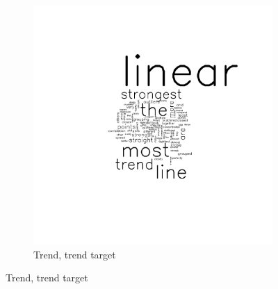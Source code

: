 \documentclass[11pt]{isuthesis}\usepackage[]{graphicx}\usepackage[]{color}
\begin{document}
\begin{figure}[ht]
\begin{subfigure}[t]{0.25\linewidth}
\end{subfigure}
\begin{subfigure}[t]{0.25\linewidth}
  \caption{Trend, trend target}
  \includegraphics[width=\linewidth]{fig-sentiment-6}
\end{subfigure}


\end{figure}
\end{document}

